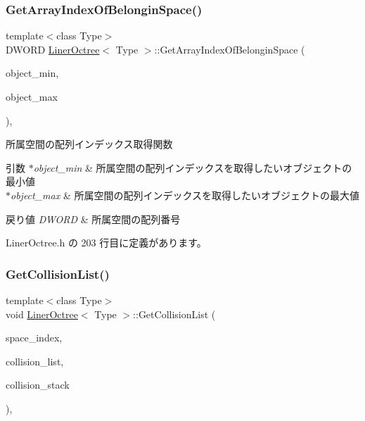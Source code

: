\subsubsection{\texorpdfstring{Get\+Array\+Index\+Of\+Belongin\+Space()}{GetArrayIndexOfBelonginSpace()}}
{\footnotesize\ttfamily template$<$class Type$>$ \\
D\+W\+O\+RD \mbox{\hyperlink{class_liner_octree}{Liner\+Octree}}$<$ Type $>$\+::Get\+Array\+Index\+Of\+Belongin\+Space (\begin{DoxyParamCaption}\item[{const \mbox{\hyperlink{class_vector3_d}{Vector3D}} $\ast$}]{object\+\_\+min,  }\item[{const \mbox{\hyperlink{class_vector3_d}{Vector3D}} $\ast$}]{object\+\_\+max }\end{DoxyParamCaption})\hspace{0.3cm}{\ttfamily [inline]}, {\ttfamily [private]}}



所属空間の配列インデックス取得関数 


\begin{DoxyParams}{引数}
{\em $\ast$object\+\_\+min} & 所属空間の配列インデックスを取得したいオブジェクトの最小値 \\
\hline
{\em $\ast$object\+\_\+max} & 所属空間の配列インデックスを取得したいオブジェクトの最大値 \\
\hline
\end{DoxyParams}

\begin{DoxyRetVals}{戻り値}
{\em D\+W\+O\+RD} & 所属空間の配列番号 \\
\hline
\end{DoxyRetVals}


 Liner\+Octree.\+h の 203 行目に定義があります。

\mbox{\label{class_liner_octree_aa166d590cbda54d856a732d0171f6554}} 
\subsubsection{\texorpdfstring{Get\+Collision\+List()}{GetCollisionList()}}
{\footnotesize\ttfamily template$<$class Type$>$ \\
void \mbox{\hyperlink{class_liner_octree}{Liner\+Octree}}$<$ Type $>$\+::Get\+Collision\+List (\begin{DoxyParamCaption}\item[{D\+W\+O\+RD}]{space\+\_\+index,  }\item[{std\+::vector$<$ Type $>$ $\ast$}]{collision\+\_\+list,  }\item[{std\+::list$<$ Type $>$ $\ast$}]{collision\+\_\+stack }\end{DoxyParamCaption})\hspace{0.3cm}{\ttfamily [inline]}, {\ttfamily [private]}}




